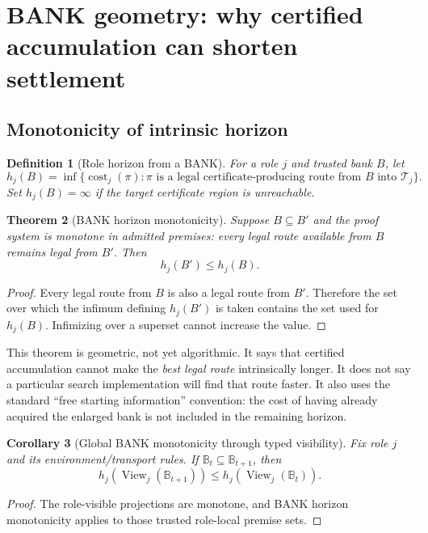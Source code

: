\documentclass[11pt]{article}
\newtheorem{definition}{Definition}[section]
\newtheorem{theorem}[definition]{Theorem}
\newtheorem{corollary}[definition]{Corollary}
\newcommand{\BANK}{\mathbb{B}}
\newcommand{\cost}{\operatorname{cost}}
\newcommand{\View}{\operatorname{View}}
\begin{document}
\section{BANK geometry: why certified accumulation can shorten settlement}

\subsection{Monotonicity of intrinsic horizon}

\begin{definition}[Role horizon from a BANK]
For a role $j$ and trusted bank $B$, let
\[
h_j(B)=\inf\{\cost_j(\pi):\pi\text{ is a legal certificate-producing route from }B\text{ into }\mathcal T_j\}.
\]
Set $h_j(B)=\infty$ if the target certificate region is unreachable.
\end{definition}

\begin{theorem}[BANK horizon monotonicity]
Suppose $B\subseteq B'$ and the proof system is monotone in admitted premises: every legal route available from $B$ remains legal from $B'$. Then
\[
\boxed{h_j(B')\le h_j(B).}
\]
\end{theorem}
\begin{proof}
Every legal route from $B$ is also a legal route from $B'$. Therefore the set over which the infimum defining $h_j(B')$ is taken contains the set used for $h_j(B)$. Infimizing over a superset cannot increase the value.
\end{proof}

This theorem is geometric, not yet algorithmic. It says that certified accumulation cannot make the \emph{best legal route} intrinsically longer. It does not say a particular search implementation will find that route faster. It also uses the standard ``free starting information'' convention: the cost of having already acquired the enlarged bank is not included in the remaining horizon.

\begin{corollary}[Global BANK monotonicity through typed visibility]
Fix role $j$ and its environment/transport rules. If $\BANK_t\subseteq\BANK_{t+1}$, then
\[
h_j\!\left(\View_j(\BANK_{t+1})\right)
\le
h_j\!\left(\View_j(\BANK_t)\right).
\]
\end{corollary}
\begin{proof}
The role-visible projections are monotone, and BANK horizon monotonicity applies to those trusted role-local premise sets.
\end{proof}
\end{document}
